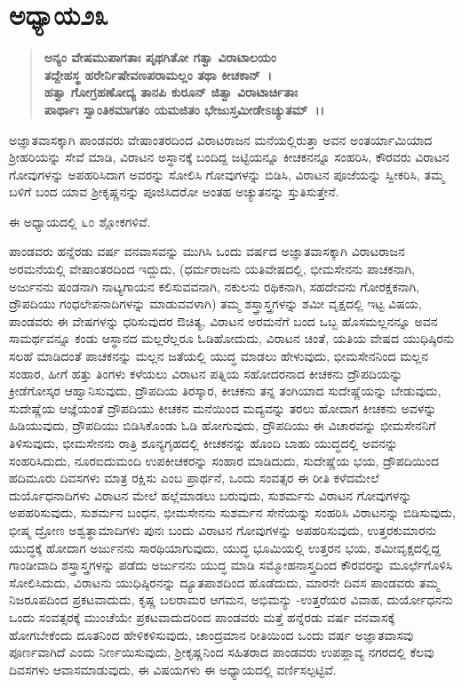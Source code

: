 \section*{ಅಧ್ಯಾಯ\enginline{-}೨೩}

\begin{verse}
\textbf{ಅನ್ಯಂ ವೇಷಮುಪಾಗತಾಃ ಪೃಥಗಿತೋ ಗತ್ವಾ ವಿರಾಟಾಲಯಂ}\\\textbf{ತದ್ದೇಹಸ್ಥ ಹರೇರ್ನಿಷೇವಣಪರಾಮಲ್ಲಂ ತಥಾ ಕೀಚಕಾನ್~।}\\\textbf{ಹತ್ವಾ ಗೋಗ್ರಹಣೋದ್ಯ ತಾನಪಿ ಕುರೂನ್ ಜಿತ್ವಾ ವಿರಾಟಾರ್ಚಿತಾಃ }\\\textbf{ಪಾರ್ಥಾಃ ಸ್ವಾಂತಿಕಮಾಗತಂ ಯಮಜಿತಂ ಭೇಜುಸ್ತಮೀಡೇಽಚ್ಯುತಮ್~।।}
\end{verse}

ಅಜ್ಞಾತವಾಸಕ್ಕಾಗಿ ಪಾಂಡವರು ವೇಷಾಂತರದಿಂದ ವಿರಾಟರಾಜನ ಮನೆಯಲ್ಲಿರುತ್ತಾ ಅವನ ಅಂತರ್ಯಾಮಿಯಾದ ಶ‍್ರೀಹರಿಯನ್ನು ಸೇವೆ ಮಾಡಿ, ವಿರಾಟನ ಅಸ್ಥಾನಕ್ಕೆ ಬಂದಿದ್ದ ಜಟ್ಟಿಯನ್ನೂ ಕೀಚಕನನ್ನೂ ಸಂಹರಿಸಿ, ಕೌರವರು ವಿರಾಟನ ಗೋವುಗಳನ್ನು ಅಪಹರಿಸಿದಾಗ ಅವರನ್ನು ಸೋಲಿಸಿ ಗೋವುಗಳನ್ನು ಬಿಡಿಸಿ, ವಿರಾಟನ ಪೂಜೆಯನ್ನು ಸ್ವೀಕರಿಸಿ, ತಮ್ಮ ಬಳಿಗೆ ಬಂದ ಯಾವ ಶ‍್ರೀಕೃಷ್ಣನನ್ನು ಪೂಜಿಸಿದರೋ ಅಂತಹ ಅಚ್ಯುತನನ್ನು ಸ್ತುತಿಸುತ್ತೇನೆ.

ಈ ಅಧ್ಯಾಯದಲ್ಲಿ ೬೦ ಶ್ಲೋಕಗಳಿವೆ.

ಪಾಂಡವರು ಹನ್ನೆರಡು ವರ್ಷ ವನವಾಸವನ್ನು ಮುಗಿಸಿ ಒಂದು ವರ್ಷದ ಅಜ್ಞಾತವಾಸಕ್ಕಾಗಿ ವಿರಾಟರಾಜನ ಅರಮನೆಯಲ್ಲಿ ವೇಷಾಂತರದಿಂದ ಇದ್ದುದು, (ಧರ್ಮರಾಜನು ಯತಿವೇಷದಲ್ಲಿ, ಭೀಮಸೇನನು ಪಾಚಕನಾಗಿ, ಅರ್ಜುನನು ಷಂಡನಾಗಿ ನಾಟ್ಯಗಾಯನ ಕಲಿಸುವವನಾಗಿ, ನಕುಲನು ರಥಿಕನಾಗಿ, ಸಹದೇವನು ಗೋರಕ್ಷಕನಾಗಿ, ದ್ರೌಪದಿಯು ಗಂಧಲೇಪನಾದಿಗಳನ್ನು ಮಾಡುವವಳಾಗಿ) ತಮ್ಮ ಶಸ್ತ್ರಾಸ್ತ್ರಗಳನ್ನು ಶಮೀ ವೃಕ್ಷದಲ್ಲಿ ಇಟ್ಟ ವಿಷಯ, ಪಾಂಡವರು ಈ ವೇಷಗಳನ್ನು ಧರಿಸುವುದರ ಔಚಿತ್ಯ, ವಿರಾಟನ ಅರಮನೆಗೆ ಬಂದ ಒಬ್ಬ ಹೊಸಮಲ್ಲನನ್ನೂ ಅವನ ಸಾಮರ್ಥವನ್ನೂ ಕಂಡು ಆಸ್ಥಾನದ ಮಲ್ಲರೆಲ್ಲರೂ ಓಡಿ\-ಹೋದುದು, ವಿರಾಟನ ಚಿಂತೆ, ಯತಿಯ ವೇಷದ ಯುಧಿಷ್ಠಿರನು ಸಲಹೆ ಮಾಡಿದಂತೆ ಪಾಚಕನನ್ನು ಮಲ್ಲನ ಜತೆಯಲ್ಲಿ ಯುದ್ಧ ಮಾಡಲು ಹೇಳುವುದು, ಭೀಮಸೇನನಿಂದ ಮಲ್ಲನ ಸಂಹಾರ, ಹೀಗೆ ಹತ್ತು ತಿಂಗಳು ಕಳೆಯಲು ವಿರಾಟನ ಪತ್ನಿಯ ಸಹೋದರನಾದ ಕೀಚಕನು ದ್ರೌಪದಿಯನ್ನು ಕ್ರೀಡೆಗೋಸ್ಕರ ಆಹ್ವಾನಿಸುವುದು, ದ್ರೌಪದಿಯ ತಿರಸ್ಕಾರ, ಕೀಚಕನು ತನ್ನ ತಂಗಿಯಾದ ಸುದೇಷ್ಣೆಯನ್ನು ಬೇಡುವುದು, ಸುದೇಷ್ಣೆಯ ಆಜ್ಞೆಯಂತೆ ದ್ರೌಪದಿಯು ಕೀಚಕನ ಮನೆಯಿಂದ ಮದ್ಯವನ್ನು ತರಲು ಹೋದಾಗ ಕೀಚಕನು ಅವಳನ್ನು ಹಿಡಿಯುವುದು, ದ್ರೌಪದಿಯು ಬಿಡಿಸಿಕೊಂಡು ಓಡಿ ಹೋಗುವುದು, ದ್ರೌಪದಿಯು ಈ ವಿಚಾರವನ್ನು ಭೀಮಸೇನನಿಗೆ ತಿಳಿಸುವುದು, ಭೀಮಸೇನನು ರಾತ್ರಿ ಶೂನ್ಯಗೃಹದಲ್ಲಿ ಕೀಚಕನನ್ನು ಹೊಂದಿ ಬಾಹು ಯುದ್ಧದಲ್ಲಿ ಅವನನ್ನು ಸಂಹರಿಸಿದುದು, ನೂರಐದುಮಂದಿ ಉಪಕೀಚಕರನ್ನು ಸಂಹಾರ ಮಾಡಿದುದು, ಸುದೇಷ್ಣೆಯ ಭಯ, ದ್ರೌಪದಿಯಿಂದ ಹದಿಮೂರು ದಿವಸಗಳು ಮಾತ್ರ ರಕ್ಷಿಸು ಎಂಬ ಪ್ರಾರ್ಥನೆ, ಒಂದು ಸಂವತ್ಸರ ಈ ರೀತಿ ಕಳೆದಮೇಲೆ ದುರ್ಯೊಧನಾದಿಗಳು ವಿರಾಟನ ಮೇಲೆ ಹಲ್ಲೆಮಾಡಲು ಬರುವುದು, ಸುಶರ್ಮನು ವಿರಾಟನ ಗೋವುಗಳನ್ನು ಅಪಹರಿಸುವುದು, ಸುಶರ್ಮನ ಬಂಧನ, ಭೀಮಸೇನನು ಸುಶರ್ಮನ ಸೇನೆಯನ್ನು ಸಂಹರಿಸಿ ವಿರಾಟನನ್ನು ಬಿಡಿಸುವುದು, ಭೀಷ್ಮ ದ್ರೋಣ ಅಶ್ವತ್ಥಾಮಾದಿಗಳು ಪುನಃ ಬಂದು ವಿರಾಟನ ಗೋವುಗಳನ್ನು ಅಪಹರಿಸುವುದು, ಉತ್ತರಕುಮಾರನು ಯುದ್ಧಕ್ಕೆ ಹೋದಾಗ ಅರ್ಜುನನು ಸಾರಥಿಯಾಗುವುದು, ಯುದ್ಧ ಭೂಮಿಯಲ್ಲಿ ಉತ್ತರನ ಭಯ, ಶಮೀವೃಕ್ಷದಲ್ಲಿದ್ದ ಗಾಂಡೀವಾದಿ ಶಸ್ತ್ರಾಸ್ತ್ರಗಳನ್ನು ಪಡೆದು ಅರ್ಜುನನು ಯುದ್ಧ ಮಾಡಿ ಸಮ್ಮೋಹನಾಸ್ತ್ರದಿಂದ ಕೌರವರನ್ನು ಮೂರ್ಛೆಗೊಳಿಸಿ ಸೋಲಿಸಿದುದು, ವಿರಾಟನು ಯುಧಿಷ್ಠಿರನನ್ನು ದ್ಯೂತಪಾಶದಿಂದ ಹೊಡೆದುದು, ಮಾರನೇ ದಿವಸ ಪಾಂಡವರು ತಮ್ಮ ನಿಜರೂಪದಿಂದ ಪ್ರಕಟವಾದುದು, ಕೃಷ್ಣ ಬಲರಾಮರ ಆಗಮನ, ಅಭಿಮನ್ಯು -ಉತ್ತರೆಯರ ವಿವಾಹ, ದುರ್ಯೋಧನನು ಒಂದು ಸಂವತ್ಸರಕ್ಕೆ ಮುಂಚೆಯೇ ಪ್ರಕಟವಾದುದರಿಂದ ಪಾಂಡವರು ಮತ್ತೆ ಹನ್ನೆರಡು ವರ್ಷ ವನವಾಸಕ್ಕೆ ಹೋಗಬೇಕೆಂದು ದೂತನಿಂದ ಹೇಳಿಕಳಿಸುವುದು, ಚಾಂದ್ರಮಾನ ರೀತಿಯಿಂದ ಒಂದು ವರ್ಷ ಅಜ್ಞಾತವಾಸವು ಪೂರ್ಣವಾಗಿದೆ ಎಂದು ನಿರ್ಣಯಿಸುವುದು, ಶ‍್ರೀಕೃಷ್ಣನಿಂದ ಸಹಿತರಾದ ಪಾಂಡವರು ಉಪಪ್ಲಾವ್ಯ ನಗರದಲ್ಲಿ ಕೆಲವು ದಿವಸಗಳು ಆವಾಸಮಾಡುವುದು, ಈ ವಿಷಯಗಳು ಈ ಅಧ್ಯಾಯದಲ್ಲಿ ವರ್ಣಿಸಲ್ಪಟ್ಟಿವೆ.


